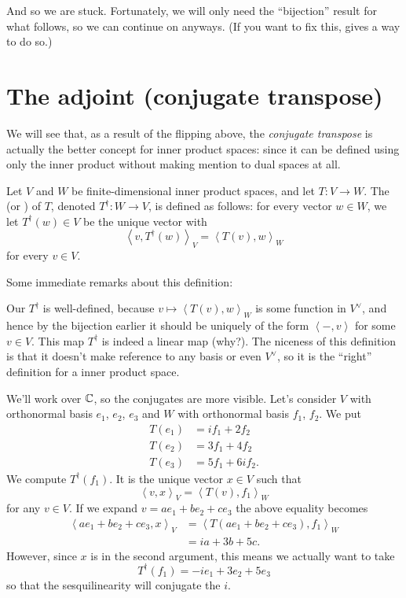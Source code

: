 And so we are stuck.
Fortunately, we will only need the ``bijection'' result
for what follows, so we can continue on anyways.
(If you want to fix this, 
gives a way to do so.)


\section{The adjoint (conjugate transpose)}
We will see that, as a result of the flipping above,
the \emph{conjugate transpose} is actually the better concept
for inner product spaces: since it can be defined using only the inner product
without making mention to dual spaces at all.
\begin{definition}
	Let $V$ and $W$ be finite-dimensional inner product spaces,
	and let $T \colon V \to W$.
	The  (or )
	of $T$, denoted $T^\dagger \colon W \to V$,
	is defined as follows: for every vector $w \in W$,
	we let $T^\dagger(w) \in V$ be the unique vector with
	\[ \left< v, T^\dagger(w) \right>_V = \left< T(v), w \right>_W \]
	for every $v \in V$.
\end{definition}

Some immediate remarks about this definition:
\begin{itemize}
\ii Our $T^\dagger$ is well-defined,
because $v \mapsto \left< T(v), w \right>_W$ is some function in $V^\vee$,
and hence by the bijection earlier
it should be uniquely of the form $\left< -, v \right>$ for some $v \in V$.
\ii This map $T^\dagger$ is indeed a linear map (why?).
\ii The niceness of this definition is that it doesn't
make reference to any basis or even $V^\vee$,
so it is the ``right'' definition for a inner product space.
\end{itemize}

\begin{example}
	We'll work over $\mathbb C$, so the conjugates are more visible.
	Let's consider $V$ with orthonormal basis $e_1$, $e_2$, $e_3$
	and $W$ with orthonormal basis $f_1$, $f_2$.
	We put
	\begin{align*}
		T(e_1) &= if_1 + 2f_2 \\
		T(e_2) &= 3f_1 + 4f_2 \\
		T(e_3) &= 5f_1 + 6if_2.
	\end{align*}
	We compute $T^\dagger(f_1)$.
	It is the unique vector $x \in V$ such that
	\[ \left< v, x \right>_V = \left< T(v), f_1 \right>_W \]
	for any $v \in V$.
	If we expand $v = ae_1 + be_2 + ce_3$ the above equality becomes
	\begin{align*}
		\left< ae_1 + be_2 + ce_3, x \right>_V
		&= \left< T(ae_1 + be_2 + ce_3), f_1 \right>_W \\
		&= ia + 3b + 5c.
	\end{align*}
	However, since $x$ is in the second argument,
	this means we actually want to take
	\[ T^\dagger(f_1) = -ie_1 + 3e_2 + 5e_3 \]
	so that the sesquilinearity will conjugate the $i$.
\end{example}


